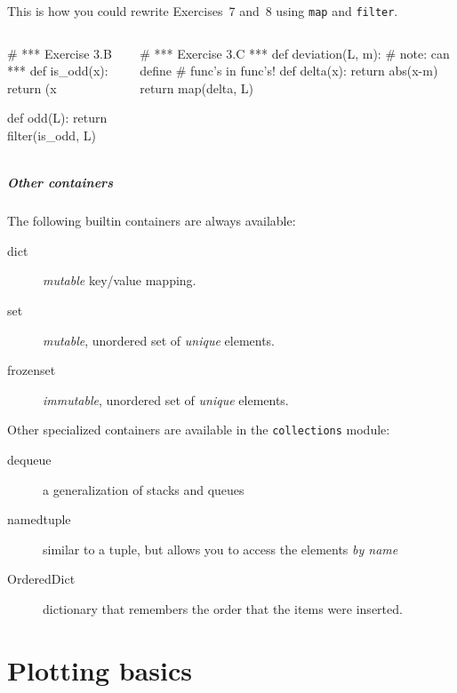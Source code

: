\documentclass[english,serif,mathserif,xcolor=pdftex,dvipsnames,table]{beamer}
\begin{document}
\begin{frame}[fragile]
  This is how you could rewrite Exercises~7 and~8 using \texttt{map} and
  \texttt{filter}.

  \begin{columns}
    \begin{column}{0.5\linewidth}
\begin{python}
# *** Exercise 3.B ***
def is_odd(x):
  return (x %

def odd(L):
  return filter(is_odd, L)
\end{python}
\end{column}
\begin{column}{0.5\linewidth}
\begin{python}
# *** Exercise 3.C ***
def deviation(L, m):
  # note: can define
  # func's in func's!
  def delta(x):
    return abs(x-m)
  return map(delta, L)
\end{python}
\end{column}
  \end{columns}
\end{frame}


\begin{frame}
  \frametitle{Other containers}

  The following builtin containers are always available:
  \begin{description}
  \item[dict] \textit{mutable} key/value mapping.
  \item[set] \textit{mutable}, unordered set of \textit{unique} elements.
  \item[frozenset] \textit{immutable}, unordered set of
    \textit{unique} elements.
  \end{description}

  \pause
  Other specialized containers are available in the
  \texttt{collections} module:

  \begin{description}
  \item[dequeue] a generalization of stacks and queues
  \item[namedtuple] similar to a tuple, but allows you to access the
    elements \textit{by name}
  \item[OrderedDict] dictionary that remembers the order that the
    items were inserted.
  \end{description}
\end{frame}


\part{Plotting basics}
\end{document}
